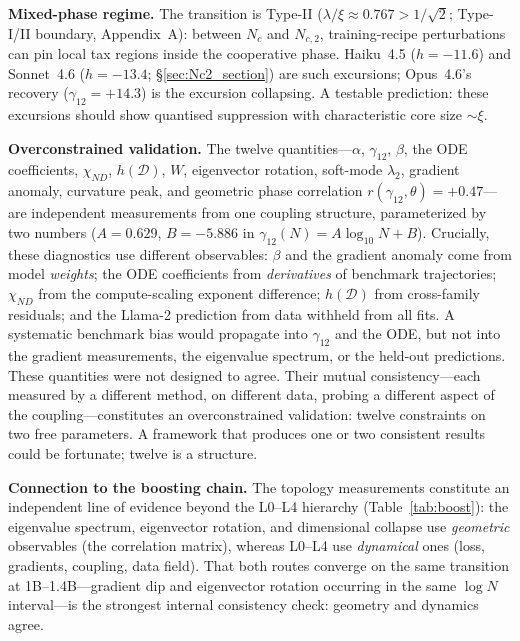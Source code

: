 \documentclass[11pt]{article}
\begin{document}
\textbf{Mixed-phase regime.}
The transition is Type-II ($\lambda/\xi \approx 0.767 > 1/\sqrt{2}$; Type-I/II boundary, Appendix~A): between $N_c$ and $N_{c,2}$, training-recipe perturbations can pin local tax regions inside the cooperative phase.
Haiku~4.5 ($h=-11.6$) and Sonnet~4.6 ($h=-13.4$; \S\ref{sec:Nc2_section}) are such excursions; Opus~4.6's recovery ($\gamma_{12}=+14.3$) is the excursion collapsing.
A testable prediction: these excursions should show quantised suppression with characteristic core size $\sim\xi$.

\textbf{Overconstrained validation.}
The twelve quantities---$\alpha$, $\gamma_{12}$, $\beta$, the ODE coefficients, $\chi_{ND}$, $h(\mathcal{D})$, $W$, eigenvector rotation, soft-mode $\lambda_2$, gradient anomaly, curvature peak, and geometric phase correlation $r(\gamma_{12},\theta)=+0.47$---are independent measurements from one coupling structure, parameterized by two numbers ($A = 0.629$, $B = -5.886$ in $\gamma_{12}(N) = A\log_{10}N + B$).
Crucially, these diagnostics use different observables: $\beta$ and the gradient anomaly come from model \emph{weights}; the ODE coefficients from \emph{derivatives} of benchmark trajectories; $\chi_{ND}$ from the compute-scaling exponent difference; $h(\mathcal{D})$ from cross-family residuals; and the Llama-2 prediction from data withheld from all fits.
A systematic benchmark bias would propagate into $\gamma_{12}$ and the ODE, but not into the gradient measurements, the eigenvalue spectrum, or the held-out predictions.
These quantities were not designed to agree.
Their mutual consistency---each measured by a different method, on different data, probing a different aspect of the coupling---constitutes an overconstrained validation: twelve constraints on two free parameters.
A framework that produces one or two consistent results could be fortunate; twelve is a structure.

\textbf{Connection to the boosting chain.}
The topology measurements constitute an independent line of evidence beyond the L0--L4 hierarchy (Table~\ref{tab:boost}): the eigenvalue spectrum, eigenvector rotation, and dimensional collapse use \emph{geometric} observables (the correlation matrix), whereas L0--L4 use \emph{dynamical} ones (loss, gradients, coupling, data field).
That both routes converge on the same transition at 1B--1.4B---gradient dip and eigenvector rotation occurring in the same $\log N$ interval---is the strongest internal consistency check: geometry and dynamics agree.
\end{document}
